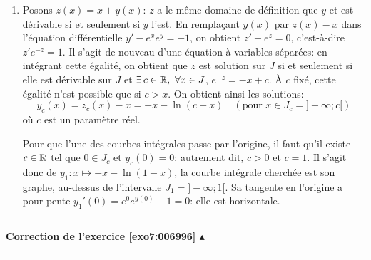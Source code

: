 \documentclass[11pt,a4paper]{article}
\newcounter{exo}
\newcommand{\correction}[1]{\hypertarget{cor7:#1}{}\label{cor7:#1}{\bf Correction de \hyperlink{exo7:#1}{l'exercice \ref{exo7:#1} $\blacktriangle$}}\vspace{1mm}\hrule\vspace{1mm}}
\newcommand{\fincorrection}{\vspace{1mm}\hrule\vspace*{7mm}}
\begin{document}
\begin{enumerate}
\begin{tikzpicture}[scale=1]
\end{tikzpicture}

\item Posons $z(x)=x+y(x)$: $z$ a le m\^eme domaine de définition que $y$ et est dérivable 
si et seulement si $y$ l'est. En remplaçant $y(x)$ par $z(x)-x$ dans l'équation 
différentielle $y'-e^xe^y=-1$, on obtient $z'-e^z=0$, c'est-à-dire $z'e^{-z}=1$. 
Il s'agit de nouveau d'une équation à variables séparées: en intégrant cette égalité, 
on obtient que $z$ est solution sur $J$ si et seulement si elle est dérivable sur 
$J$ et $\exists\,c\in\R,\ \forall x\in J$, $e^{-z}=-x+c$. 
\`A $c$ fixé, cette égalité n'est possible que si $c>x$. On obtient ainsi les solutions:
$$y_c(x)=z_c(x)-x=-x-\ln(c-x)\quad (\text{pour } x\in J_c=]-\infty;c[)$$
où $c$ est un paramètre réel.

Pour que l'une des courbes intégrales passe par l'origine, 
il faut qu'il existe $c\in\R$ tel que $0\in J_c$ et $y_c(0)=0$: 
autrement dit, $c>0$ et $c=1$. Il s'agit donc de $y_1:x\mapsto-x-\ln(1-x)$, 
la courbe intégrale cherchée est son graphe, au-dessus de l'intervalle $J_1=]-\infty;1[$. 
Sa tangente en l'origine a pour pente $y_1'(0)=e^0e^{y(0)}-1=0$: elle est horizontale. 
\end{enumerate}
\fincorrection
\correction{006996}\
\end{document}
